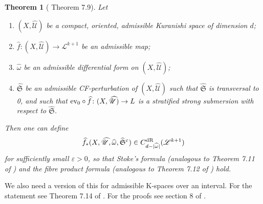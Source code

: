 \documentclass[10pt]{amsart}
\numberwithin{equation}{section}
\theoremstyle{plain}
\newtheorem{theorem}{Theorem}[section]
\theoremstyle{definition}
\theoremstyle{remark}
\numberwithin{equation}{section}
\newcommand{\ev}{\textup{ev}}
\newcommand{\wh}[1]{\widehat{#1}}
\newcommand{\dR}{\textup{dR}}
\begin{document}
{\begin{theorem}[\cite{Irie2} Theorem 7.9]\label{Thm: CFgivesDR}
	Let 
	\begin{enumerate}
		\item $(X,\wh{\mathscr{U}})$ be a compact, oriented, admissible Kuranishi space of dimension $d$;
		\item $\wh{f}\colon (X,\wh{\mathscr{U}})\to \mathscr{L}^{k+1}$ be an admissible map;
		\item $\wh{\omega}$ be an admissible differential form on $(X,\wh{\mathscr{U}})$;
		\item  $\wh{\mathfrak{S}}$ be an admissible CF-perturbation of $(X,\wh{\mathscr{U}})$ such that $\wh{\mathfrak{S}}$ is transversal to 0, and such that $\ev_0\circ \wh{f}\colon (X,\wh{\mathscr{U}})\to L$ is a stratified strong submersion with respect to $\wh{\mathfrak{S}}$.
	\end{enumerate}
	Then one can define \[ \wh{f}_*(X,\wh{\mathscr{U}}, \wh{\omega}, \wh{\mathfrak{S}}^\varepsilon) \in C^\dR_{d-|\wh{\omega}|}(\mathscr{L}^{k+1}) \]for sufficiently small $\varepsilon>0$, so that Stoke's formula (analogous to Theorem 7.11 of \cite{Irie2}) and the fibre product formula (analogous to Theorem 7.12 of \cite{Irie2}) hold.
\end{theorem}


We also need a version of this for admissible K-spaces over an interval. For the statement see Theorem 7.14 of \cite{Irie2}.
For the proofs see section 8 of \cite{Irie2}.




}
\end{document}
